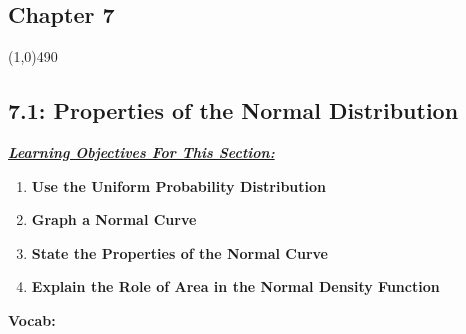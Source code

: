 \documentclass{report}
\begin{document}
      \pagebreak 
      \begin{center}
          \section*{Chapter 7}
      \end{center}
      \line(1,0){490}
      \bigbreak \noindent 
      \subsection*{7.1: Properties of the Normal Distribution}
      \bigbreak \noindent 
      \textbf{\textit{\underline{Learning Objectives For This Section:}}}
      \begin{enumerate}
          \item \textbf{Use the Uniform Probability Distribution}
          \item \textbf{Graph a Normal Curve}
          \item \textbf{State the Properties of the Normal Curve}
          \item \textbf{Explain the Role of Area in the Normal Density Function}
      \end{enumerate}
      \bigbreak \noindent 
      \textbf{Vocab:}
\end{document}
